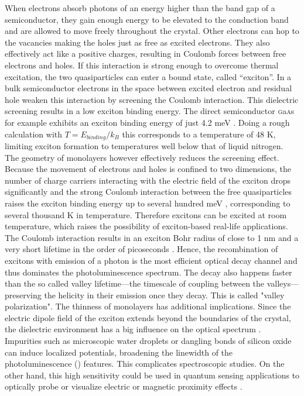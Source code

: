 When electrons absorb photons of an energy higher than the band gap of a semiconductor, they gain enough energy to be elevated to the conduction band and are allowed to move freely throughout the crystal. Other electrons can hop to the vacancies making the holes just as free as excited electrons. They also effectively act like a positive charges, resulting in Coulomb forces between free electrons and holes. If this interaction is strong enough to overcome thermal excitation, the two quasiparticles can enter a bound state, called ``exciton''. In a bulk semiconductor electrons in the space between excited electron and residual hole weaken this interaction by screening the Coulomb interaction. This dielectric screening results in a low exciton binding energy. The direct semiconductor \textsc{g}a\textsc{a}s for example exhibits an exciton binding energy of just 4.2 meV \cite{pelant_luminescence_2012}. Doing a rough calculation with $T=E_{binding}/k_B$ this corresponds to a temperature of 48 K, limiting exciton formation to temperatures well below that of liquid nitrogen.
The geometry of \tmdg monolayers however effectively reduces the screening effect. Because the movement of electrons and holes is confined to two dimensions, the number of charge carriers interacting with the electric field of the exciton drops significantly and the strong Coulomb interaction between the free quasiparticles raises the exciton binding energy up to several hundred meV \cite{chernikov_exciton_2014, hanbicki_measurement_2015, he_tightly_2014}, corresponding to several thousand K in temperature. Therefore excitons can be excited at room temperature, which raises the possibility of exciton-based real-life applications. The Coulomb interaction results in an exciton Bohr radius of close to 1 nm and a very short lifetime in the order of picoseconds \cite{palummo_exciton_2015}. Hence, the recombination of excitons with emission of a photon is the most efficient optical decay channel and thus dominates the photoluminescence spectrum.
The decay also happens faster than the so called valley lifetime---the timescale of coupling between the valleys---preserving the helicity in their emission once they decay. This is called "valley polarization".
The thinness of \tmdg monolayers has additional implications. Since the electric dipole field of the exciton extends beyond the boundaries of the crystal, the dielectric environment has a big influence on the optical spectrum \cite{stier_probing_2016, borghardt_engineering_2017, jakubczyk_impact_2018}. Impurities such as microscopic water droplets or dangling bonds of silicon oxide can induce localized potentials, broadening the linewidth of the photoluminescence (\pl\!) features. This complicates spectroscopic studies. On the other hand, this high sensitivity could be used in quantum sensing applications to optically probe or visualize electric or magnetic proximity effects \cite{peng_valley_2017, zhao_enhanced_2017, smolenski_tuning_2016, neumann_opto-valleytronic_2017}.


